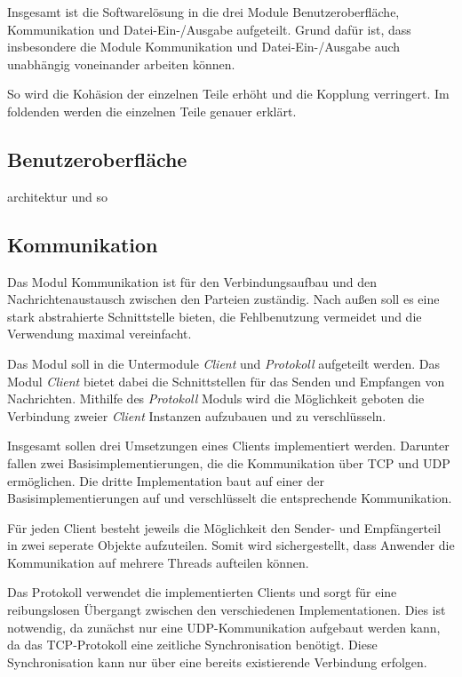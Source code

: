 \label{sc:architektur}

Insgesamt ist die Softwarelösung in die drei Module Benutzeroberfläche, Kommunikation und Datei-Ein-/Ausgabe aufgeteilt. Grund dafür ist, dass insbesondere die Module Kommunikation und Datei-Ein-/Ausgabe auch unabhängig voneinander arbeiten können.

So wird die Kohäsion der einzelnen Teile erhöht und die Kopplung verringert. Im foldenden werden die einzelnen Teile genauer erklärt.

\subsection{Benutzeroberfläche}
architektur und so

\subsection{Kommunikation}
Das Modul Kommunikation ist für den Verbindungsaufbau und den Nachrichtenaustausch zwischen den Parteien zuständig. Nach außen soll es eine stark abstrahierte Schnittstelle bieten, die Fehlbenutzung vermeidet und die Verwendung maximal vereinfacht.

Das Modul soll in die Untermodule \textit{Client} und \textit{Protokoll} aufgeteilt werden. Das Modul \textit{Client} bietet dabei die Schnittstellen für das Senden und Empfangen von Nachrichten. Mithilfe des \textit{Protokoll} Moduls wird die Möglichkeit geboten die Verbindung zweier \textit{Client} Instanzen aufzubauen und zu verschlüsseln.

Insgesamt sollen drei Umsetzungen eines Clients implementiert werden. Darunter fallen zwei Basisimplementierungen, die die Kommunikation über TCP und UDP ermöglichen. Die dritte Implementation baut auf einer der Basisimplementierungen auf und verschlüsselt die entsprechende Kommunikation.

Für jeden Client besteht jeweils die Möglichkeit den Sender- und Empfängerteil in zwei seperate Objekte aufzuteilen. Somit wird sichergestellt, dass Anwender die Kommunikation auf mehrere Threads aufteilen können.

Das Protokoll verwendet die implementierten Clients und sorgt für eine reibungslosen Übergangt zwischen den verschiedenen Implementationen. Dies ist notwendig, da zunächst nur eine UDP-Kommunikation aufgebaut werden kann, da das TCP-Protokoll eine zeitliche Synchronisation benötigt. Diese Synchronisation kann nur über eine bereits existierende Verbindung erfolgen.

